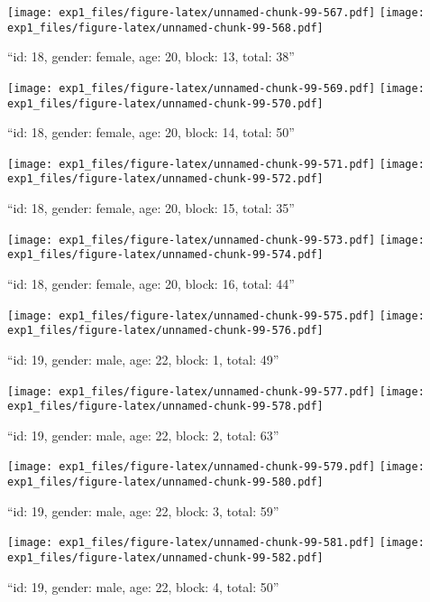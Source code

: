 \documentclass[,]{article}
\begin{document}
\texttt{[image: exp1\_files/figure-latex/unnamed-chunk-99-567.pdf]}
\texttt{[image: exp1\_files/figure-latex/unnamed-chunk-99-568.pdf]}

\newpage
[1] 

``id: 18, gender: female, age: 20, block: 13, total: 38''

\texttt{[image: exp1\_files/figure-latex/unnamed-chunk-99-569.pdf]}
\texttt{[image: exp1\_files/figure-latex/unnamed-chunk-99-570.pdf]}

\newpage
[1] 

``id: 18, gender: female, age: 20, block: 14, total: 50''

\texttt{[image: exp1\_files/figure-latex/unnamed-chunk-99-571.pdf]}
\texttt{[image: exp1\_files/figure-latex/unnamed-chunk-99-572.pdf]}

\newpage
[1] 

``id: 18, gender: female, age: 20, block: 15, total: 35''

\texttt{[image: exp1\_files/figure-latex/unnamed-chunk-99-573.pdf]}
\texttt{[image: exp1\_files/figure-latex/unnamed-chunk-99-574.pdf]}

\newpage
[1] 

``id: 18, gender: female, age: 20, block: 16, total: 44''

\texttt{[image: exp1\_files/figure-latex/unnamed-chunk-99-575.pdf]}
\texttt{[image: exp1\_files/figure-latex/unnamed-chunk-99-576.pdf]}

\newpage
[1] 

``id: 19, gender: male, age: 22, block: 1, total: 49''

\texttt{[image: exp1\_files/figure-latex/unnamed-chunk-99-577.pdf]}
\texttt{[image: exp1\_files/figure-latex/unnamed-chunk-99-578.pdf]}

\newpage
[1] 

``id: 19, gender: male, age: 22, block: 2, total: 63''

\texttt{[image: exp1\_files/figure-latex/unnamed-chunk-99-579.pdf]}
\texttt{[image: exp1\_files/figure-latex/unnamed-chunk-99-580.pdf]}

\newpage
[1] 

``id: 19, gender: male, age: 22, block: 3, total: 59''

\texttt{[image: exp1\_files/figure-latex/unnamed-chunk-99-581.pdf]}
\texttt{[image: exp1\_files/figure-latex/unnamed-chunk-99-582.pdf]}

\newpage
[1] 

``id: 19, gender: male, age: 22, block: 4, total: 50''
\end{document}
